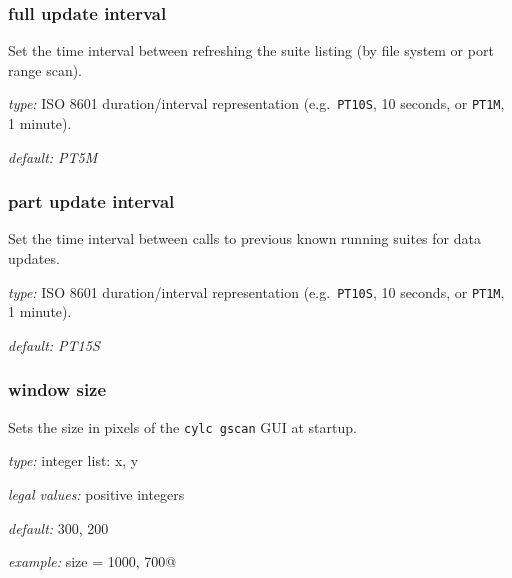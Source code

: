 \subsubsection{full update interval}

Set the time interval between refreshing the suite listing (by file system or
port range scan).

\begin{myitemize}
\item {\em type:} ISO 8601 duration/interval representation (e.g.\ 
\lstinline=PT10S=, 10 seconds, or \lstinline=PT1M=, 1 minute).
\item {\em default: PT5M}
\end{myitemize}

\subsubsection{part update interval}

Set the time interval between calls to previous known running suites for data
updates.

\begin{myitemize}
\item {\em type:} ISO 8601 duration/interval representation (e.g.\ 
\lstinline=PT10S=, 10 seconds, or \lstinline=PT1M=, 1 minute).
\item {\em default: PT15S}
\end{myitemize}

\subsubsection{window size}

Sets the size in pixels of the \lstinline=cylc gscan= GUI at startup.

\begin{myitemize}
    \item {\em type:} integer list: x, y
    \item {\em legal values:} positive integers
    \item {\em default:} 300, 200
    \item {\em example:} \lstinline@window size = 1000, 700@
\end{myitemize}

